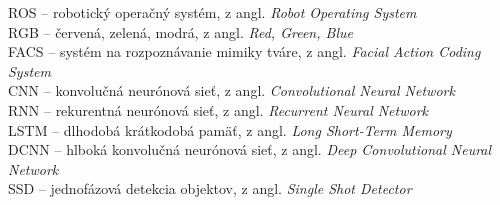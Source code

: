 %
%

ROS -- robotický operačný systém, z angl. \emph{\foreignlanguage{english}{Robot Operating System}} \\ 
RGB -- červená, zelená, modrá, z angl. \emph{\foreignlanguage{english}{Red, Green, Blue}}\\
FACS -- systém na rozpoznávanie mimiky tváre, z angl. \emph{\foreignlanguage{english}{Facial Action Coding System}}\\
CNN -- konvolučná neurónová sieť, z angl. \emph{\foreignlanguage{english}{Convolutional Neural Network}}\\
RNN -- rekurentná neurónová sieť, z angl. \emph{\foreignlanguage{english}{Recurrent Neural Network}}\\
LSTM -- dlhodobá krátkodobá pamäť, z angl. \emph{\foreignlanguage{english}{Long Short-Term Memory}}\\
DCNN -- hlboká konvolučná neurónová sieť, z angl. \emph{\foreignlanguage{english}{Deep Convolutional Neural Network}}\\
SSD -- jednofázová detekcia objektov, z angl. \emph{\foreignlanguage{english}{Single Shot Detector}}\\

